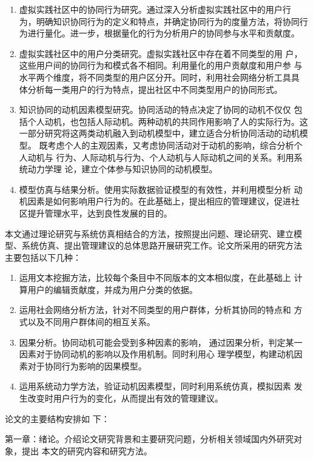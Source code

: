 \begin{enumerate}
\item 虚拟实践社区中的协同行为研究。通过深入分析虚拟实践社区中的用户行
  为，明确知识协同行为的定义和特点，并确定协同行为的度量方法，将协同行
  为进行量化。进一步，根据量化的行为分析用户的协同参与水平和贡献度。
\item 虚拟实践社区中的用户分类研究。虚拟实践社区中存在着不同类型的用
  户，这些用户间的协同行为和模式各不相同。利用量化的用户贡献度和用户参
  与水平两个维度，将不同类型的用户区分开。同时，利用社会网络分析工具具
  体分析每一类用户的行为特点，提出社区中不同类型用户的协同形式。
\item 知识协同的动机因素模型研究。协同活动的特点决定了协同的动机不仅仅
包括个人动机，也包括人际动机。两种动机的共同作用影响了人的实际行为。这
一部分研究将这两类动机融入到动机模型中，建立适合分析协同活动的动机模型。
既考虑个人的主观因素，又考虑协同活动对于动机的影响，综合分析个人动机与
行为、人际动机与行为、个人动机与人际动机之间的关系。利用系统动力学理
论，建立个体参与知识协同的动机模型。
\item 模型仿真与结果分析。使用实际数据验证模型的有效性，并利用模型分析
  动机因素是如何影响用户行为的。在此基础上，提出相应的管理建议，促进社
  区提升管理水平，达到良性发展的目的。

\end{enumerate}

本文通过理论研究与系统仿真相结合的方法，按照提出问题、理论研究、建立模
型、系统仿真、提出管理建议的总体思路开展研究工作。论文所采用的研究方法
主要包括以下几种：

\begin{enumerate}
\item 运用文本挖掘方法，比较每个条目中不同版本的文本相似度，在此基础上
  计算用户的编辑贡献度，并成为用户分类的依据。
\item 运用社会网络分析方法，针对不同类型的用户群体，分析其协同的特点和
  方式以及不同用户群体间的相互关系。
\item 因果分析。协同动机可能会受到多种因素的影响，
  通过因果分析，判定某一因素对于协同动机的影响以及作用机制。同时利用心
  理学模型，构建动机因素对于协同行为影响的因果模型。
\item 运用系统动力学方法，验证动机因素模型，同时利用系统仿真，模拟因素
  发生改变时用户行为的变化，从而提出有效的管理建议。
\end{enumerate}
论文的主要结构安排如
下：

第一章：绪论。介绍论文研究背景和主要研究问题，分析相关领域国内外研究对象，提出
本文的研究内容和研究方法。

